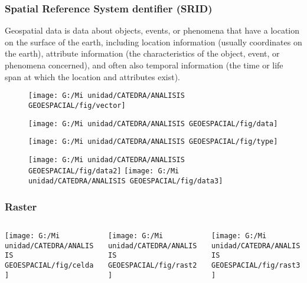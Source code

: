 \documentclass[14pt]{beamer}
\begin{document}
\begin{frame}
\frametitle{Spatial Reference System dentifier (SRID)}
\scriptsize{Geospatial data is data about objects, events, or phenomena that have a location on the surface of the earth, including location information (usually coordinates on the earth), attribute information (the characteristics of the object, event, or phenomena concerned), and often also temporal information (the time or life span at which the location and attributes exist).}
  \begin{figure}
    \centering
    \texttt{[image: G:/Mi unidad/CATEDRA/ANALISIS GEOESPACIAL/fig/vector]}
  \end{figure}
\end{frame}
\begin{frame}
  \begin{figure}
    \centering
    \texttt{[image: G:/Mi unidad/CATEDRA/ANALISIS GEOESPACIAL/fig/data]}
  \end{figure}
\end{frame}
\begin{frame}
  \begin{figure}
    \centering
    \texttt{[image: G:/Mi unidad/CATEDRA/ANALISIS GEOESPACIAL/fig/type]}
  \end{figure}
\end{frame}
\begin{frame}
  \begin{figure}
    \centering
    \texttt{[image: G:/Mi unidad/CATEDRA/ANALISIS GEOESPACIAL/fig/data2]}
    \texttt{[image: G:/Mi unidad/CATEDRA/ANALISIS GEOESPACIAL/fig/data3]}
  \end{figure}
\end{frame}
\begin{frame}
\frametitle{Raster}
  \begin{columns}
		\begin{column}{.33\linewidth}
		 \texttt{[image: G:/Mi unidad/CATEDRA/ANALISIS GEOESPACIAL/fig/celda]}
		\end{column}
		\begin{column}{.33\linewidth}
			 \texttt{[image: G:/Mi unidad/CATEDRA/ANALISIS GEOESPACIAL/fig/rast2]}
		\end{column}
		\begin{column}{.33\linewidth}
			 \texttt{[image: G:/Mi unidad/CATEDRA/ANALISIS GEOESPACIAL/fig/rast3]}
		\end{column}
	\end{columns}
\end{frame}
\end{document}
